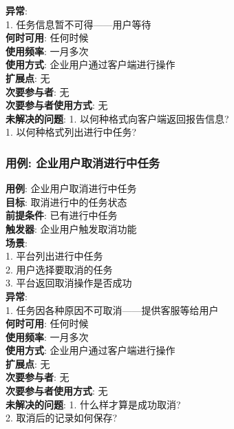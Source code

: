 \documentclass[UTF8]{article}
\begin{document}
\textbf{异常}: \\
	\hspace*{2em} 1. 任务信息暂不可得——用户等待 \\
\textbf{何时可用}: 任何时候
\\
\textbf{使用频率}: 一月多次
\\
\textbf{使用方式}: 企业用户通过客户端进行操作 \\
\textbf{扩展点}: 无
\\
\textbf{次要参与者}: 无
\\
\textbf{次要参与者使用方式}: 无
\\
\textbf{未解决的问题}: 
	\hspace*{2em} 1. 以何种格式向客户端返回报告信息? \\
	\hspace*{2em} 1. 以何种格式列出进行中任务? \\
		
\subsubsection{用例: 企业用户取消进行中任务}
\noindent
\textbf{用例}: 企业用户取消进行中任务
\\
\textbf{目标}: 取消进行中的任务状态
\\
\textbf{前提条件}: 已有进行中任务
\\
\textbf{触发器}: 企业用户触发取消功能
\\
\textbf{场景}: \\
	\hspace*{2em} 1. 平台列出进行中任务 \\
	\hspace*{2em} 2. 用户选择要取消的任务 \\
	\hspace*{2em} 3. 平台返回取消操作是否成功 \\
	
\textbf{异常}: \\
	\hspace*{2em} 1. 任务因各种原因不可取消——提供客服等给用户 \\
\textbf{何时可用}: 任何时候
\\
\textbf{使用频率}: 一月多次
\\
\textbf{使用方式}: 企业用户通过客户端进行操作 \\
\textbf{扩展点}: 无
\\
\textbf{次要参与者}: 无
\\
\textbf{次要参与者使用方式}: 无
\\
\textbf{未解决的问题}: 
	\hspace*{2em} 1. 什么样才算是成功取消? \\
	\hspace*{2em} 2. 取消后的记录如何保存? \\
			
\end{document}
